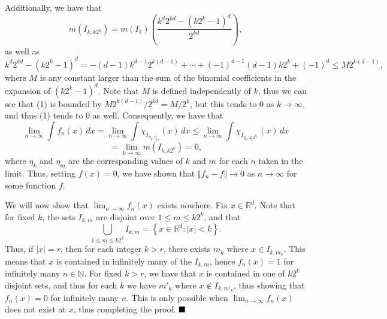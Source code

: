 \documentclass[12pt]{article}
\newcommand{\N}{\ensuremath{\mathbb{N}}}
\newcommand{\R}{\ensuremath{\mathbb{R}}}
\newcommand{\braceb}[1]{\left\{#1\right\}}
\newcommand{\parenb}[1]{\left(#1\right)}
\newcommand{\vertb}[1]{\left\vert#1\right\vert}
\newcommand{\dvertb}[1]{\left\Vert#1\right\Vert}
\newcommand{\done}{\ensuremath{\strut\hfill\blacksquare}}
\begin{document}
Additionally, we have that
\begin{equation}
	m(I_{k,k2^k})
	= m(I_1)\parenb{\frac{k^d2^{kd} - (k2^k - 1)^d}{2^{kd}}},
\end{equation}
as well as
\[
	k^d2^{kd} - (k2^k - 1)^d
	= -(d - 1)k^{d - 1}2^{k(d - 1)} + \cdots
	+ (-1)^{d - 1}(d - 1)k2^k + (-1)^d
	\leq M2^{k(d - 1)},
\]
where \( M \) is any constant larger than the sum of the binomial
coefficients in the expansion of \( (k2^k - 1)^d \).
Note that \( M \) is defined independently of \( k \), thus
we can see that (1) is bounded by \( M2^{k(d - 1)}/2^{kd} = M/2^k \),
but this tends to 0 as \( k \to \infty \), and thus (1) tends to 0 as well.
Consequently, we have that
\[
	\lim_{n \to \infty} \int f_n(x) \, dx
	= \lim_{n \to \infty} \int \chi_{I_{\eta_k,\eta_m}}(x) \, dx
	\leq \lim_{n \to \infty} \int \chi_{I_{\eta_k,\eta_k2^{\eta_k}}}(x) \, dx
\]
\[
	= \lim_{k \to \infty} m(I_{k,k2^k})
	= 0,
\]
where \( \eta_k \) and \( \eta_m \) are the corresponding values of \( k \)
and \( m \) for each \( n \) taken in the limit.
Thus, setting \( f(x) = 0 \), we have shown that \( \dvertb{f_n - f} \to 0 \)
as \( n \to \infty \) for some function \( f \).

We will now show that \( \lim_{n \to \infty} f_n(x) \) exists nowhere.
Fix \( x \in \R^d \).
Note that for fixed \( k \), the sets \( I_{k,m} \) are disjoint over
\( 1 \leq m \leq k2^k \), and that
\[
	\bigcup_{1 \leq m \leq k2^k} I_{k,m}
	= \braceb{x \in \R^d : \vertb{x} < k}.
\]
Thus, if \( \vertb{x} = r \), then for each integer \( k > r \), there exists
\( m_k \) where \( x \in I_{k,m_k} \).
This means that \( x  \) is contained in infinitely many of the
\( I_{k,m} \), hence \( f_n(x) = 1 \) for infinitely many \( n \in \N \).
For fixed \( k > r \), we have that \( x \) is contained in one
of \( k2^k \) disjoint sets, and thus for each \( k \) we have \( m'_k \)
where \( x \notin I_{k,m'_k} \), thus showing that \( f_n(x) = 0 \) for
infinitely many \( n \).
This is only possible when \( \lim_{n \to \infty} f_n(x) \) does not exist
at \( x \), thus completing the proof.
\done
\end{document}
